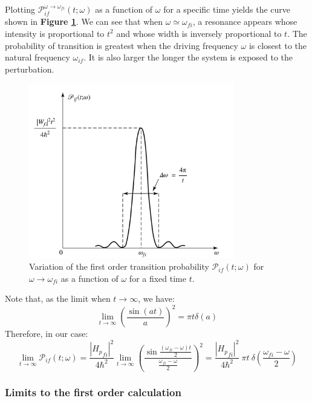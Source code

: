 Plotting $\mathcal{P}_{if}^{\omega\to\omega_{fi}}(t;\omega)$ as a function of $\omega$ for a specific time yields the curve shown in \textbf{Figure \ref{fig:P_if}}. We can see that when $\omega \simeq \omega_{fi}$, a resonance appears whose intensity is proportional to $t^2$ and whose width is inversely proportional to $t$. The probability of transition is greatest when the driving frequency $\omega$ is closest to the natural frequency $\omega_{if}$. It is also larger the longer the system is exposed to the perturbation.
\begin{figure}[htbp]
    \centering
    \includegraphics[width=0.8\textwidth]{images/P_if.png}
    \caption{Variation of the first order transition probability $\mathcal{P}_{if}(t;\omega)$ for $\omega \to \omega_{fi}$ as a function of $\omega$ for a fixed time $t$.}
    \label{fig:P_if}
\end{figure}

Note that, as the limit when $t\to\infty$, we have:
\begin{equation}
    \lim_{t\to\infty} \left(\frac{\sin(a t )}{ a}\right)^2 = \pi t \delta(a )
\end{equation}
Therefore, in our case:
\begin{equation}
    \lim_{t\to \infty} \mathcal{P}_{if}(t;\omega) = \frac{\left|{H_p}_{fi}\right|^2}{4\hbar^2}\lim_{t\to \infty}\left(\frac{\sin\frac{(\omega_{fi}-\omega)t}{2}}{\frac{\omega_{fi} - \omega}{2}} \right)^2 = \frac{\left|{H_p}_{fi}\right|^2}{4\hbar^2}\ \pi t\ \delta\left(\frac{\omega_{fi} - \omega}{2}\right)
\end{equation}

\subsubsection{Limits to the first order calculation}


